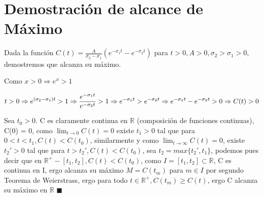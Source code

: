 \documentclass{article}
\begin{document}
\section{Demostración de alcance de Máximo}

Dada la función $C(t) = \frac{A}{\sigma_2 - \sigma_1}(e^{-\sigma_1t} - e^{-\sigma_2t})$ para $t > 0, A > 0, \sigma_2 > \sigma_1 > 0$, demostremos que alcanza su máximo.

Como $x > 0 \Rightarrow e^x > 1$

\begin{center}

    \begin{math}
        \mathlarger{
        t > 0 \newline 
        \Rightarrow e^{(\sigma_2 - \sigma_1)t} > 1 
        \Rightarrow \frac{e^{-\sigma_1t}}{e^{-\sigma_2t}} > 1 
        \Rightarrow e^{-\sigma_1t} > e^{-\sigma_2t} 
        \Rightarrow e^{-\sigma_1t} - e^{-\sigma_2t} > 0  
        \Rightarrow C(t) >  0 }
    \end{math}

\end{center}

Sea $t_0 > 0$. C es claramente continua en $\mathbb{R}$ (composición de funciones continuas), C(0) = 0, como $\lim_{t \rightarrow 0} C(t) = 0$ existe $t_1 > 0$ tal que para $0 < t < t_1, C(t) < C(t_0)$, similarmente y como $\lim_{t \rightarrow \infty} C(t) = 0$, existe $t_2' > 0$ tal que para $t > t_2', C(t) < C(t_0)$, sea $t_2 = max\{t_2', t_1\}$, podemos pues decir que en $\mathbb{R}^+ - [t_1, t_2], C(t) < C(t_0)$, como $I = [t_1, t_2] \subset \mathbb{R}$, C es continua en I, ergo alcanza su máximo $M = C(t_m)$ para $m \in I$ por segundo Teorema de Weierstrass, ergo para todo $t \in \mathbb{R}^+, C(t_m) \geq C(t)$, ergo C alcanza su máximo en $\mathbb{R}$ $\blacksquare$ 
\end{document}
